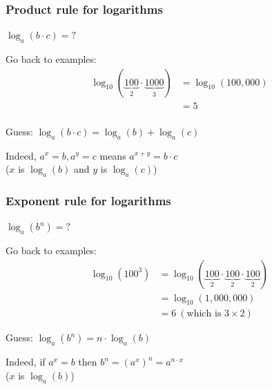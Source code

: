 \documentclass{beamer}
\renewcommand{\alert}[1]{\textcolor{MyTeal}{#1}}
\begin{document}
      \begin{frame}
        \frametitle{Product rule for logarithms}
        \begin{center}
          $\log_a(b\cdot c) = ?$
        \end{center}

        \pause

        Go back to examples:
        \begin{align*}
          \log_{10}(\underbrace{100}_2\cdot \underbrace{1000}_3) &= \log_{10}(100{,}000)\\
                                     &= 5\\
        \end{align*}

        \pause
        \vspace{-.3in}\alert{Guess:} $\log_a(b\cdot c) = \log_a(b) + \log_a(c)$

        \pause

        \bigskip

        Indeed, $a^x = b, a^y = c$ means $a^{x+y} = b\cdot c$\\
        ($x$ is $\log_a(b)$ and $y$ is $\log_a(c)$)
      \end{frame}

            \begin{frame}
              \frametitle{Exponent rule for logarithms}
                      \begin{center}
          $\log_a(b^n) = ?$
        \end{center}

        \pause

        Go back to examples:
        \begin{align*}
          \log_{10}(100^3) &= \log_{10}(\underbrace{100}_2\cdot \underbrace{100}_2 \cdot \underbrace{100}_2)\\
                                          &= \log_{10}(1{,}000{,}000)\\
          &= 6\ (\text{which is } 3\times 2)
        \end{align*}

        \pause
        \vspace{-.1in}\alert{Guess:} $\log_a(b^n) = n\cdot \log_a(b)$

        \pause

        \bigskip

        Indeed, if $a^x = b$ then $b^n = (a^x)^n = a^{n\cdot x}$\\
        ($x$ is $\log_a(b)$)
        
      \end{frame}
\end{document}
